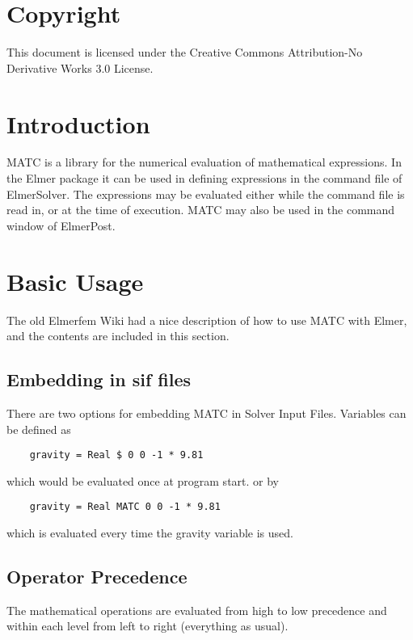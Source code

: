 \section*{Copyright}

This document is licensed under the Creative Commons Attribution-No Derivative Works 3.0 License. 


\section{Introduction}
MATC is a library for the numerical evaluation of mathematical expressions. In the Elmer 
package it can be used in defining expressions in the command file of ElmerSolver. The expressions
may be evaluated either while the command file is read in, or at the time of execution.
MATC may also be used in the command window of ElmerPost.   

\section{Basic Usage}
The old Elmerfem Wiki had a nice description of how to use MATC with Elmer, and the contents
are included in this section.

\subsection{Embedding in sif files}

There are two options for embedding MATC in Solver Input Files. Variables can be defined as

\begin{verbatim}
    gravity = Real $ 0 0 -1 * 9.81
\end{verbatim}

\noindent which would be evaluated once at program start. or by

\begin{verbatim}
    gravity = Real MATC 0 0 -1 * 9.81
\end{verbatim}

\noindent which is evaluated every time the gravity variable is used.

\subsection{Operator Precedence}

The mathematical operations are evaluated from high to low precedence and within each level from left to right (everything as usual).

